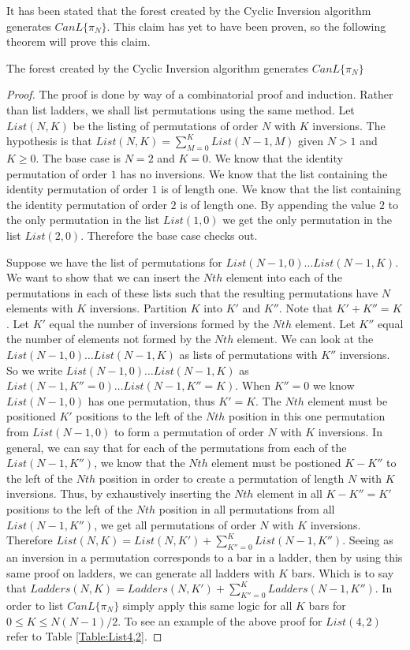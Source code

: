 It has been stated that the forest created by the Cyclic Inversion algorithm generates $CanL\{\pi_{N}\}$. This claim has 
yet to have been proven, so the following theorem will prove this claim.

\begin{theorem}
  
  The forest created by the Cyclic Inversion algorithm generates $CanL\{\pi_{N}\}$
\end{theorem}
\begin{proof}
  The proof is done by way of a combinatorial proof and induction. Rather than list ladders, we shall list permutations using the same method.  
  Let $List(N, K)$ be the listing of permutations of order $N$ with $K$ inversions. The hypothesis is that $List(N, K)=\sum_{M=0}^{K} List(N-1, M)$ 
  given $N>1$ and $K \geq 0$.
  The base case is $N=2$ and $K=0$. We know that the identity permutation of order $1$ has no inversions. We know that the list containing the identity 
  permutation of order $1$ is of length one. We know that the list containing the identity permutation of order $2$ is of length one. By appending the 
  value $2$ to the only permutation in the list $List(1, 0)$ we get the only permutation in the list $List(2, 0)$. Therefore the base case checks out.
  
  Suppose we have the list of permutations for $List(N-1, 0) \dots List(N-1, K)$. We want to show that we can insert the $Nth$ element into each of the
  permutations in each of these lists such that the resulting permutations have $N$ elements with $K$ inversions. Partition $K$ into $K'$ and $K''$. Note that 
  $K'+K''=K$.
  Let $K'$ equal the number of inversions formed by the $Nth$ element. Let $K''$ equal the number of elements not formed by the $Nth$ element.
  We can look at the $List(N-1, 0) \dots List(N-1, K)$ as lists of permutations with $K''$ inversions. So we write 
  $List(N-1, 0) \dots List(N-1, K)$ as $List(N-1, K''=0) \dots List(N-1, K''=K)$. When $K''=0$ we know $List(N-1, 0)$ has one permutation, thus $K'=K$.
  The $Nth$ element must be positioned $K'$ positions to the left of the $Nth$ position in this one permutation from $List(N-1, 0)$ to form a permutation of order $N$ with $K$ inversions. 
  In general, we can say that for each of the permutations from each of the $List(N-1, K'')$, we know that the $Nth$ element must be postioned $K-K''$ to the left of the $Nth$ position in order to 
  create a permutation of length $N$ with $K$ inversions. Thus, by exhaustively inserting the $Nth$ element in all $K-K''=K'$ positions to the left of the $Nth$ position 
  in all permutations from all $List(N-1, K'')$, we get all permutations of order $N$ with $K$ inversions. 
  Therefore $List(N, K) = List(N, K') + \sum_{K''=0}^{K} List(N-1, K'') $.
  Seeing as an inversion in a permutation corresponds to a bar in 
  a ladder, then by using this same proof on ladders, we can generate all ladders with $K$ bars. 
  Which is to say that $Ladders(N, K) = Ladders(N, K') + \sum_{K''=0}^{K} Ladders(N-1, K'')$.
  In order to list $CanL\{\pi_{N}\}$ simply apply this same logic for all $K$ bars for $0 \leq K \leq N(N-1)/2$. To see an example of the above proof for $List(4, 2)$ refer to Table \ref{Table:List4,2}.


\end{proof}
